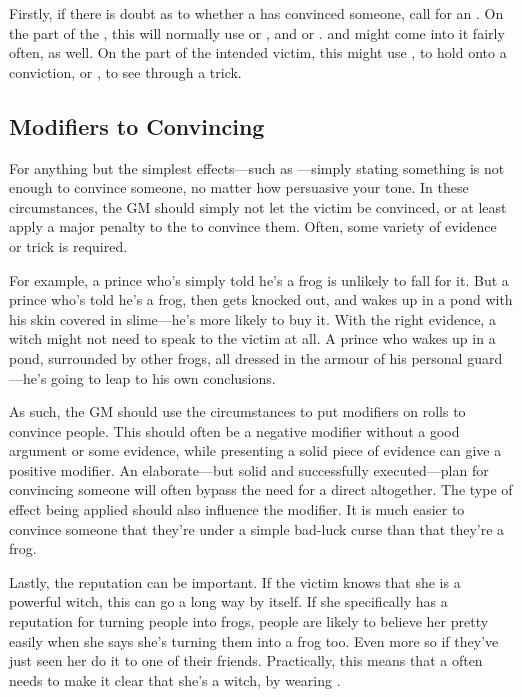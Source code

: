 Firstly, if there is doubt as to whether a  has convinced someone, call for an {\opposedtest}.
On the part of the , this will normally use  or , and  or .
 and  might come into it fairly often, as well.
On the part of the intended victim, this might use , to hold onto a conviction, or , to see through a trick.

\subsection{Modifiers to Convincing}

For anything but the simplest effects---such as ---simply stating something is not enough to convince someone, no matter how persuasive your tone.
In these circumstances, the GM should simply not let the victim be convinced, or at least apply a major penalty to the {\test} to convince them.
Often, some variety of evidence or trick is required.

For example, a prince who's simply told he's a frog is unlikely to fall for it.
But a prince who's told he's a frog, then gets knocked out, and wakes up in a pond with his skin covered in slime---he's more likely to buy it.
With the right evidence, a witch might not need to speak to the victim at all.
A prince who wakes up in a pond, surrounded by other frogs, all dressed in the armour of his personal guard---he's going to leap to his own conclusions.

As such, the GM should use the circumstances to put modifiers on rolls to convince people.
This should often be a negative modifier without a good argument or some evidence, while presenting a solid piece of evidence can give a positive modifier.
An elaborate---but solid and successfully executed---plan for convincing someone will often bypass the need for a direct {\test} altogether.
The type of effect being applied should also influence the modifier.
It is much easier to convince someone that they're under a simple bad-luck curse than that they're a frog.

Lastly, the  reputation can be important.
If the victim knows that she is a powerful witch, this can go a long way by itself.
If she specifically has a reputation for turning people into frogs, people are likely to believe her pretty easily when she says she's turning them into a frog too.
Even more so if they've just seen her do it to one of their friends.
Practically, this means that a  often needs to make it clear that she's a witch, by wearing {\thehat}.

